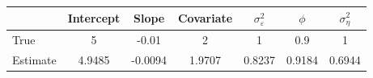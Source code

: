 \begin{tabular}{lcccccc}
\toprule
& Intercept & Slope & Covariate & $\sigma_\varepsilon^2$ & $\phi$ & $\sigma_\eta^2$ \\
\midrule
True & 5 & -0.01 & 2 & 1 & 0.9 & 1 \\
Estimate & 4.9485 & -0.0094 & 1.9707 & 0.8237 & 0.9184 & 0.6944 \\
\bottomrule
\end{tabular}

